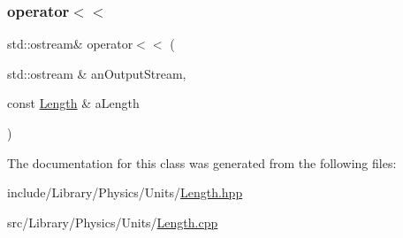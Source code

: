 \mbox{\label{classlibrary_1_1physics_1_1units_1_1_length_a95a13170a8d57cb0060eae94520eace4}} 
\subsubsection{\texorpdfstring{operator$<$$<$}{operator<<}}
{\footnotesize\ttfamily std\+::ostream\& operator$<$$<$ (\begin{DoxyParamCaption}\item[{std\+::ostream \&}]{an\+Output\+Stream,  }\item[{const \hyperlink{classlibrary_1_1physics_1_1units_1_1_length}{Length} \&}]{a\+Length }\end{DoxyParamCaption})\hspace{0.3cm}{\ttfamily [friend]}}



The documentation for this class was generated from the following files\+:\begin{DoxyCompactItemize}
\item 
include/\+Library/\+Physics/\+Units/\hyperlink{_length_8hpp}{Length.\+hpp}\item 
src/\+Library/\+Physics/\+Units/\hyperlink{_length_8cpp}{Length.\+cpp}\end{DoxyCompactItemize}
